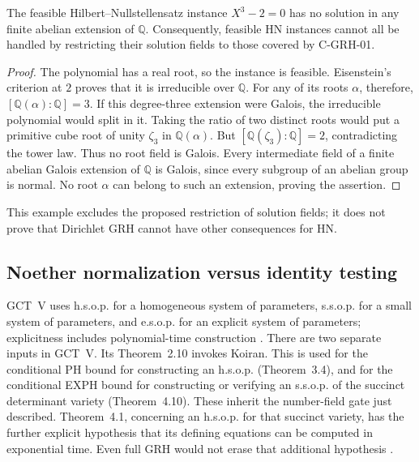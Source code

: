 \begin{proposition}
The feasible Hilbert--Nullstellensatz instance \(X^3-2=0\) has no
solution in any finite abelian extension of \(\mathbb Q\).
Consequently, feasible HN instances cannot all be handled by restricting
their solution fields to those covered by C-GRH-01.
\end{proposition}
\begin{proof}
The polynomial has a real root, so the instance is feasible.
Eisenstein's criterion at \(2\) proves that it is irreducible over
\(\mathbb Q\).  For any of its roots \(\alpha\), therefore,
\([\mathbb Q(\alpha):\mathbb Q]=3\).
If this degree-three extension were Galois, the irreducible polynomial
would split in it.  Taking the ratio of two distinct roots would put
a primitive cube root of unity \(\zeta_3\) in \(\mathbb Q(\alpha)\).
But \([\mathbb Q(\zeta_3):\mathbb Q]=2\), contradicting the tower law.
Thus no root field is Galois.  Every intermediate field of a finite
abelian Galois extension of \(\mathbb Q\) is Galois, since every
subgroup of an abelian group is normal.  No root \(\alpha\) can belong
to such an extension, proving the assertion.
\end{proof}

This example excludes the proposed restriction of solution fields;
it does not prove that Dirichlet GRH cannot have other consequences
for HN.

\subsection{Noether normalization versus identity testing}

GCT~V uses h.s.o.p. for a homogeneous system of parameters, s.s.o.p.
for a small system of parameters, and e.s.o.p. for an explicit system
of parameters; explicitness includes polynomial-time construction
\cite[\S1.2]{CGCTV}.
There are two separate inputs in GCT~V.  Its Theorem~2.10 invokes Koiran.
This is used for the conditional PH bound for constructing an h.s.o.p.
(Theorem~3.4), and for the conditional EXPH bound for constructing or
verifying an s.s.o.p. of the succinct determinant variety
(Theorem~4.10).  These inherit the number-field gate just described.
Theorem~4.1, concerning an h.s.o.p. for that succinct variety, has the further
explicit hypothesis that its defining equations can be computed in
exponential time.  Even full GRH would not erase that additional hypothesis
\cite[Theorems~2.10, 3.4, 4.1, 4.10]{CGCTV}.

